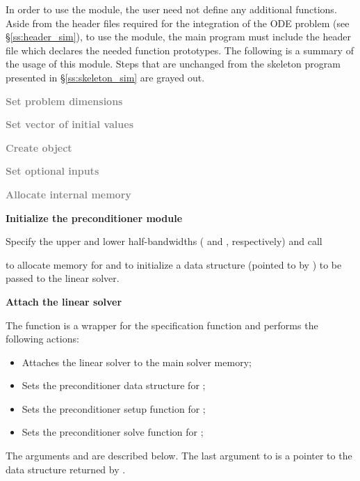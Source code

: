 In order to use the {\cvbandpre} module, the user need not define any
additional functions. 
Aside from the header files required for the integration of the ODE problem
(see \S\ref{ss:header_sim}),  to use the {\cvbandpre} module, the main program 
must include the header file  which declares the needed
function prototypes.
The following is a summary of the usage of this module. Steps that are unchanged from the skeleton
program presented in \S\ref{ss:skeleton_sim} are grayed out.
\begin{Steps}
  
\item
  \textcolor{gray}{\bf Set problem dimensions}

\item
  \textcolor{gray}{\bf Set vector of initial values}
 
\item
  \textcolor{gray}{\bf Create {\cvodes} object}

\item
  \textcolor{gray}{\bf Set optional inputs}

\item
  \textcolor{gray}{\bf Allocate internal memory}

\item \label{i:bandpre_init}
  {\bf Initialize the {\cvbandpre} preconditioner module}

  Specify the upper and lower half-bandwidths ( and , respectively) and call 


  to allocate memory for and to initialize a data structure (pointed to by ) to be 
  passed to the {\cvspgmr} linear solver.

\item \label{i:bandpre_attach}
  {\bf Attach the {\cvspgmr} linear solver}


  The function  is a wrapper for the {\cvspgmr} specification
  function  and performs the following actions:
  \begin{itemize}
    \item Attaches the {\cvspgmr} linear solver to the main {\cvodes} solver memory;
    \item Sets the preconditioner data structure for {\cvbandpre};
    \item Sets the preconditioner setup function for {\cvbandpre};
    \item Sets the preconditioner solve function for {\cvbandpre};
  \end{itemize}
  The arguments  and  are described below.
  The last argument to  is a pointer to the {\cvbandpre} data
  structure returned by .


\end{Steps}
